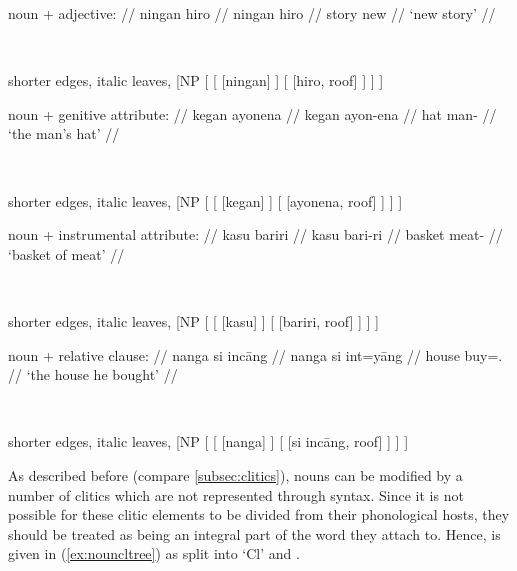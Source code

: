 \pex\label{ex:nounmods}
\a %
	\begin{minipage}[t]{.5\linewidth}
	\begingl
		\glpreamble noun + adjective: //
		\gla ningan hiro //
		\glb ningan hiro //
		\glc story new //
		\glft `new story' //
	\endgl
	\end{minipage}
	~
	\begin{forest} shorter edges, italic leaves,
	[NP
		[
			[
				[{ningan}]
			]
			[{}
				[{hiro}, roof]
			]
		]
	]
	\end{forest}

\a %
	\begin{minipage}[t]{.5\linewidth}
	\begingl
		\glpreamble noun + genitive attribute: //
		\gla kegan ayonena //
		\glb kegan ayon-ena //
		\glc hat man-\Gen{} //
		\glft `the man's hat' //
	\endgl
	\end{minipage}
	~
	\begin{forest} shorter edges, italic leaves,
	[NP
		[
			[
				[{kegan}]
			]
			[{}
				[{ayonena}, roof]
			]
		]
	]
	\end{forest}

\a %
	\begin{minipage}[t]{.5\linewidth}
	\begingl
		\glpreamble noun + instrumental attribute: //
		\gla kasu bariri //
		\glb kasu bari-ri //
		\glc basket meat-\Ins{} //
		\glft `basket of meat' //
	\endgl
	\end{minipage}
	~
	\begin{forest} shorter edges, italic leaves,
	[NP
		[
			[
				[{kasu}]
			]
			[{}
				[{bariri}, roof]
			]
		]
	]
	\end{forest}

\a %
	\begin{minipage}[t]{.5\linewidth}
	\begingl
		\glpreamble noun + relative clause: //
		\gla nanga si incāng //
		\glb nanga si int=yāng //
		\glc house \Rel{} buy=\TsgM{}.\Aarg{} //
		\glft `the house he bought' //
	\endgl
	\end{minipage}
	~
	\begin{forest} shorter edges, italic leaves,
	[NP
		[
			[
				[{nanga}]
			]
			[{}
				[{si incāng}, roof]
			]
		]
	]
	\end{forest}

\xe

As described before (compare \autoref{subsec:clitics}), nouns can be modified
by a number of clitics which are not represented through syntax. Since it is
not possible for these clitic elements to be divided from their phonological
hosts, they should be treated as being an integral part of the word they attach
to. Hence,  is given in (\ref{ex:nouncltree}) as split into `Cl' and
.

